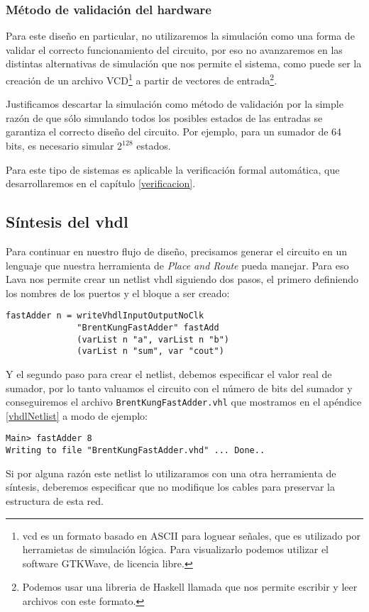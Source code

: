 \subsubsection{Método de validación del hardware}
Para este diseño en particular, no utilizaremos la simulación como una forma de validar el correcto funcionamiento del circuito, por eso no avanzaremos en las distintas alternativas de simulación que nos permite el sistema, como puede ser la creación de un archivo VCD\footnote{\gls{vcd} es un formato basado en ASCII para loguear señales, que es utilizado por herramietas de simulación lógica. Para visualizarlo podemos utilizar el software GTKWave, de licencia libre.} a partir de vectores de entrada\footnote{Podemos usar una libreria de Haskell llamada  que nos permite escribir y leer archivos con este formato.}.

Justificamos descartar la simulación como método de validación por la simple razón de que sólo simulando todos los posibles estados de las entradas se garantiza el correcto diseño del circuito. Por ejemplo, para un sumador de 64 bits, es necesario simular $2^{128}$ estados.

Para este tipo de sistemas es aplicable la verificación formal automática, que desarrollaremos en el capítulo \ref{verificacion}.

\subsection{Síntesis del  \gls{vhdl}}

Para continuar en nuestro flujo de diseño, precisamos generar el circuito en un lenguaje que nuestra herramienta de \emph{Place and Route} pueda manejar. Para eso Lava nos permite crear un netlist \gls{vhdl} siguiendo dos pasos, el primero definiendo los nombres de los puertos y el bloque a ser creado:
\begin{lstlisting}
fastAdder n = writeVhdlInputOutputNoClk
              "BrentKungFastAdder" fastAdd
              (varList n "a", varList n "b")
              (varList n "sum", var "cout")
\end{lstlisting}

Y el segundo paso para crear el netlist, debemos especificar el valor real de sumador, por lo tanto valuamos el circuito con el número de bits del sumador y conseguiremos el archivo \verb_BrentKungFastAdder.vhl_ que mostramos en el apéndice \ref{vhdlNetlist} a modo de ejemplo:
\begin{lstlisting}
Main> fastAdder 8
Writing to file "BrentKungFastAdder.vhd" ... Done..
\end{lstlisting}

\noindent Si por alguna razón este netlist lo utilizaramos con una otra herramienta de síntesis, deberemos especificar que no modifique los cables para preservar la estructura de esta red.


